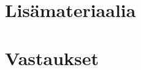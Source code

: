 \liitetyyli











%


\section{Lisämateriaalia}

%



% 



%


\newpage
\section{Vastaukset}
\begin{vastaussivu}

\end{vastaussivu}

